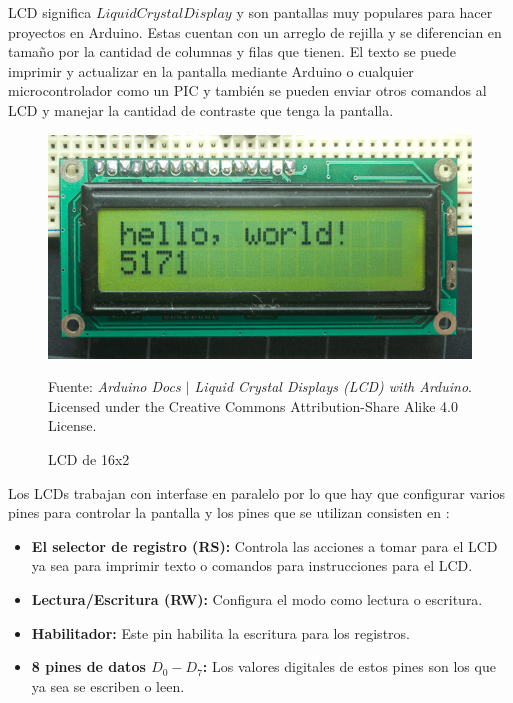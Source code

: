\documentclass{article}
\begin{document}
    LCD significa $Liquid Crystal Display$ y son pantallas muy populares para
    hacer proyectos en Arduino. Estas cuentan con un arreglo de rejilla y se
    diferencian en tamaño por la cantidad de columnas y filas que tienen. El
    texto se puede imprimir y actualizar en la pantalla mediante Arduino o
    cualquier microcontrolador como un PIC y también se pueden enviar otros
    comandos al LCD y manejar la cantidad de contraste que tenga la pantalla.

    \begin{figure}[H]
        \centering
        \includegraphics[width=0.3\paperwidth]{images/lcd-photo}
        \caption{LCD de 16x2}\footnotesize
        Fuente: \textit{Arduino Docs $\mid$ Liquid Crystal Displays (LCD)
            with Arduino}. Licensed under the Creative Commons
        Attribution-Share Alike 4.0 License. \cite{arduino-docs-lcd-2021}
    \end{figure}

    Los LCDs trabajan con interfase en paralelo por lo que hay que configurar
    varios pines para controlar la pantalla y los pines que se utilizan
    consisten en \cite{arduino-docs-lcd-2021}:

    \begin{itemize}
        \item \textbf{El selector de registro (RS):} Controla las acciones a
        tomar para el LCD ya sea para imprimir texto o comandos para
        instrucciones para el LCD.
        \item \textbf{Lectura/Escritura (RW):} Configura el modo como lectura
        o escritura.
        \item \textbf{Habilitador:} Este pin habilita la escritura para los
        registros.
        \item \textbf{8 pines de datos $D_0-D_7$:} Los valores digitales de
        estos pines son los que ya sea se escriben o leen.
    \end{itemize}
\end{document}
